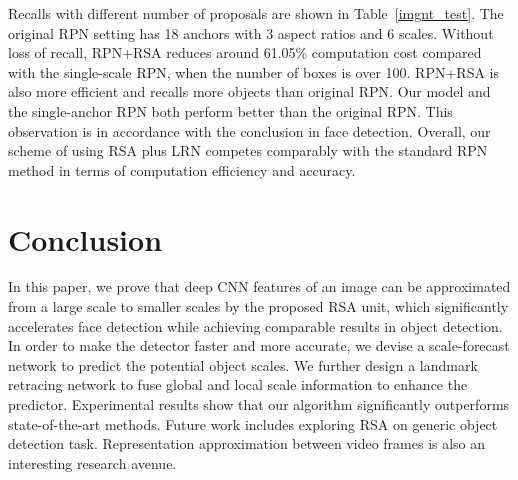 \documentclass[10pt,twocolumn,letterpaper]{article}
\begin{document}
Recalls with different number of proposals are shown in Table~\ref{imgnt_test}.
The original RPN setting has  18 anchors with 3 aspect ratios and 6 scales.
Without loss of recall, RPN+RSA reduces around 61.05\% computation cost compared with the single-scale RPN, when the number of boxes is over 100. RPN+RSA is also more efficient and recalls more objects than original RPN.
Our model and the single-anchor RPN both perform better than the original RPN. 
This observation is in accordance with the conclusion in face detection. 
Overall, our scheme of using RSA plus LRN competes comparably with the standard RPN method in terms of computation efficiency and accuracy.


\section{Conclusion}
In this paper, we prove that deep CNN features of an image can be approximated from a large scale to smaller scales by the proposed RSA unit, which significantly accelerates face detection while achieving comparable results in object detection.
In order to make the detector faster and more accurate, we devise a scale-forecast network to predict the potential object scales.
We further design a landmark retracing network to fuse global and local scale information to enhance the predictor. Experimental results show that our algorithm significantly outperforms state-of-the-art methods. Future work includes exploring RSA on generic object detection task. Representation approximation between video frames is also an interesting research avenue.


{\small


}
\end{document}
